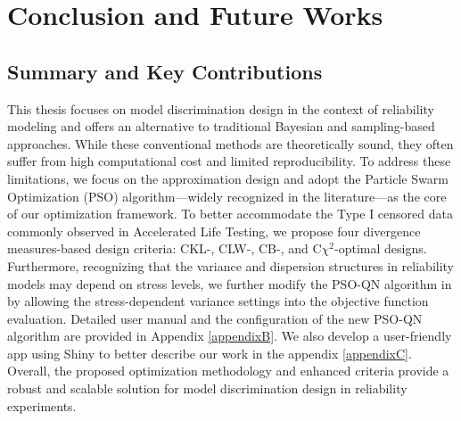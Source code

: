 \chapter{Conclusion and Future Works\label{CH: conclusion}}

\section{Summary and Key Contributions}

\hspace*{8mm} This thesis focuses on model discrimination design in the context of reliability modeling and offers an alternative to traditional Bayesian and sampling-based approaches. While these conventional methods are theoretically sound, they often suffer from high computational cost and limited reproducibility. To address these limitations, we focus on the approximation design and adopt the Particle Swarm Optimization (PSO) algorithm—widely recognized in the literature—as the core of our optimization framework. To better accommodate the Type I censored data commonly observed in Accelerated Life Testing, we propose four divergence measures-based design criteria: CKL-, CLW-, CB-, and C$\chi^2$-optimal designs. Furthermore, recognizing that the variance and dispersion structures in reliability models may depend on stress levels, we further modify the PSO-QN algorithm in \cite{chen2020hybrid} by allowing the stress-dependent variance settings into the objective function evaluation. Detailed user manual and the configuration of the new PSO-QN algorithm are provided in Appendix \ref{appendixB}. We also develop a user-friendly app using Shiny to better describe our work in the appendix \ref{appendixC}.  Overall, the proposed optimization methodology and enhanced criteria provide a robust and scalable solution for model discrimination design in reliability experiments.

